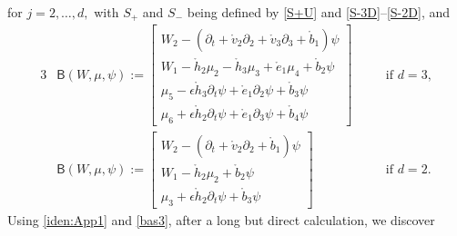 \documentclass[twoside,11pt]{article}
\numberwithin{equation}{section}
\def\p{\partial}
\begin{document}
for $ j=2,\ldots,d,$ with $S_{+} $ and $S_- $ being defined by \eqref{S+U} and \eqref{S-3D}--\eqref{S-2D},
and
\begin{alignat}{3}
	\nonumber		
	&\mathsf{B}(W,\mu, \psi)	
	:=\begin{bmatrix}
		W_2-(\p_t+\mathring{v}_2\p_2+\mathring{v}_3\p_3+\mathring{b}_1)\psi\\[1mm]
		W_1-\mathring{{h}}_2 \mu_2-\mathring{{h}}_3 \mu_3+\mathring{e}_1 \mu_4	+\mathring{b}_2 \psi\\[1mm]				
		\mu_5-\epsilon \mathring{h}_3 \p_t \psi+\mathring{e}_1\p_2\psi
		+\mathring{b}_3 \psi \\[1mm]
		\mu_6+\epsilon \mathring{h}_2 \p_t \psi+\mathring{e}_1\p_3\psi
		+\mathring{b}_4\psi
	\end{bmatrix}\quad
	&&	\textrm{if }d=3,\\[1mm]
	&\mathsf{B}(W,\mu, \psi)	
	:=\begin{bmatrix}
		W_2-(\p_t+\mathring{v}_2\p_2 +\mathring{b}_1)\psi\\[1mm]		
		W_1-\mathring{{h}}_2 \mu_2 		+\mathring{b}_2 \psi\\[1mm]		
		\mu_3+\epsilon \mathring{h}_2 \p_t \psi+\mathring{b}_3\psi
	\end{bmatrix}\quad
	&&	\textrm{if }d=2.
	\nonumber	
\end{alignat}
	Using \eqref{iden:App1} and \eqref{bas3}, after a long but direct calculation, we discover
\end{document}
